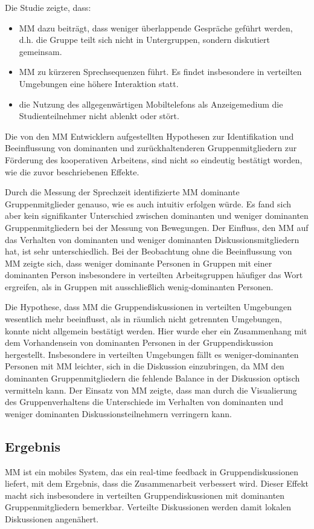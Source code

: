 Die Studie zeigte, dass:

\begin{itemize}
  \item MM dazu beiträgt, dass weniger überlappende Gespräche geführt werden, d.h. die
Gruppe teilt sich nicht in Untergruppen, sondern diskutiert gemeinsam.
  \item MM zu kürzeren Sprechsequenzen führt. Es findet insbesondere in verteilten
Umgebungen eine höhere Interaktion statt.
  \item die Nutzung des allgegenwärtigen Mobiltelefons als Anzeigemedium die
Studienteilnehmer nicht ablenkt oder stört.

\end{itemize}

Die von den MM Entwicklern aufgestellten Hypothesen zur Identifikation und
Beeinflussung von dominanten und zurückhaltenderen Gruppenmitgliedern zur
Förderung des kooperativen Arbeitens, sind nicht so eindeutig bestätigt worden,
wie die zuvor beschriebenen Effekte.

Durch die Messung der Sprechzeit identifizierte MM dominante Gruppenmitglieder
genauso, wie es auch intuitiv erfolgen würde. Es fand sich aber kein
signifikanter Unterschied zwischen dominanten und weniger dominanten
Gruppenmitgliedern bei der Messung von Bewegungen.
Der Einfluss, den MM auf das Verhalten von dominanten und weniger dominanten
Diskussionsmitgliedern hat, ist sehr unterschiedlich.
Bei der Beobachtung ohne die Beeinflussung von MM zeigte sich, dass weniger
dominante Personen in Gruppen mit einer dominanten Person insbesondere in
verteilten Arbeitsgruppen häufiger das Wort ergreifen, als in Gruppen mit
ausschließlich wenig-do\-min\-ant\-en Personen.

Die Hypothese, dass MM die Gruppendiskussionen in verteilten Umgebungen
wesentlich mehr beeinflusst, als in räumlich nicht getrennten Umgebungen, konnte
nicht allgemein bestätigt werden. Hier wurde eher ein Zusammenhang mit dem
Vorhandensein von dominanten Personen in der Gruppendiskussion hergestellt.
Insbesondere in verteilten Umgebungen fällt es weniger-dominanten Personen mit
MM leichter, sich in die Diskussion einzubringen, da MM den dominanten
Gruppenmitgliedern die fehlende Balance in der Diskussion optisch vermitteln
kann. 
Der Einsatz von MM zeigte, dass man durch die Visualierung des Gruppenverhaltens
die Unterschiede im Verhalten von dominanten und weniger dominanten
Diskussionsteilnehmern verringern kann.

\subsection{Ergebnis}
MM ist ein mobiles System, das ein real-time feedback in Gruppendiskussionen
liefert, mit dem Ergebnis, dass die Zusammenarbeit verbessert wird.
Dieser Effekt macht sich insbesondere in verteilten Gruppendiskussionen mit
dominanten Gruppenmitgliedern bemerkbar. Verteilte Diskussionen werden damit
lokalen Diskussionen angenähert.


